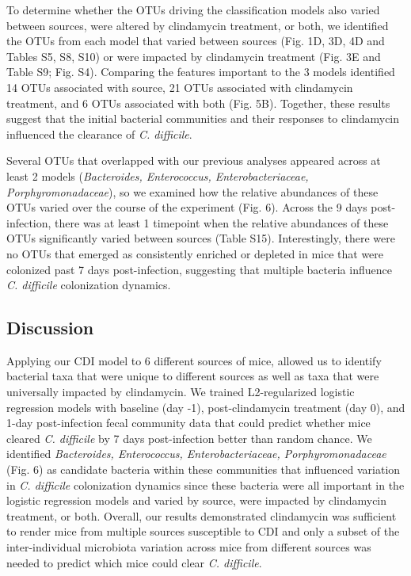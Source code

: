 \documentclass[
  11pt,
]{article}
\begin{document}
To determine whether the OTUs driving the classification models also
varied between sources, were altered by clindamycin treatment, or both,
we identified the OTUs from each model that varied between sources (Fig.
1D, 3D, 4D and Tables S5, S8, S10) or were impacted by clindamycin
treatment (Fig. 3E and Table S9; Fig. S4). Comparing the features
important to the 3 models identified 14 OTUs associated with source, 21
OTUs associated with clindamycin treatment, and 6 OTUs associated with
both (Fig. 5B). Together, these results suggest that the initial
bacterial communities and their responses to clindamycin influenced the
clearance of \emph{C. difficile}.

Several OTUs that overlapped with our previous analyses appeared across
at least 2 models (\emph{Bacteroides, Enterococcus, Enterobacteriaceae,
Porphyromonadaceae}), so we examined how the relative abundances of
these OTUs varied over the course of the experiment (Fig. 6). Across the
9 days post-infection, there was at least 1 timepoint when the relative
abundances of these OTUs significantly varied between sources (Table
S15). Interestingly, there were no OTUs that emerged as consistently
enriched or depleted in mice that were colonized past 7 days
post-infection, suggesting that multiple bacteria influence \emph{C.
difficile} colonization dynamics.

\hypertarget{discussion}{%
\subsection{Discussion}\label{discussion}}

Applying our CDI model to 6 different sources of mice, allowed us to
identify bacterial taxa that were unique to different sources as well as
taxa that were universally impacted by clindamycin. We trained
L2-regularized logistic regression models with baseline (day -1),
post-clindamycin treatment (day 0), and 1-day post-infection fecal
community data that could predict whether mice cleared \emph{C.
difficile} by 7 days post-infection better than random chance. We
identified \emph{Bacteroides, Enterococcus, Enterobacteriaceae,
Porphyromonadaceae} (Fig. 6) as candidate bacteria within these
communities that influenced variation in \emph{C. difficile}
colonization dynamics since these bacteria were all important in the
logistic regression models and varied by source, were impacted by
clindamycin treatment, or both. Overall, our results demonstrated
clindamycin was sufficient to render mice from multiple sources
susceptible to CDI and only a subset of the inter-individual microbiota
variation across mice from different sources was needed to predict which
mice could clear \emph{C. difficile}.
\end{document}
